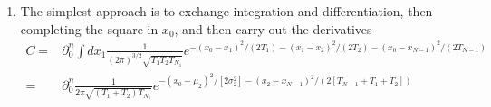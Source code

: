\begin{enumerate}
    \item The simplest approach is to exchange integration and differentiation, then completing the square in $x_0$,
    and then carry out the derivatives
    \begin{align}
      C=&\partial_0^n\int dx_1  \frac{1}{(2\pi)^{3/2}\sqrt{T_1T_2T_{N_1}}}e^{-(x_0-x_1)^2/(2T_1)-(x_1-x_2)^2/(2T_2)-(x_0-x_{N-1})^2/(2T_{N-1})}\\
      =&\partial_0^n \frac{1}{2\pi\sqrt{(T_1+T_2)T_{N_1}}}e^{-(x_0-\mu_2)^2/[2\sigma_2^2]-(x_2-x_{N-1})^2/(2[T_{N-1}+T_1+T_2])}\\

\end{align}
\end{enumerate}
